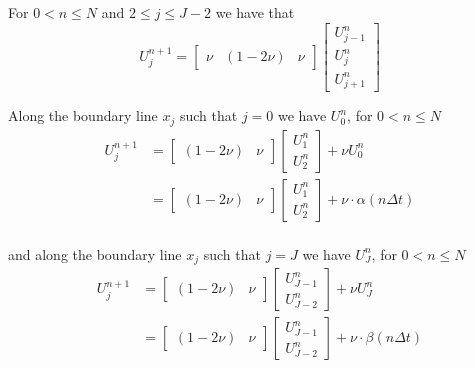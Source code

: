 \documentclass[12pt]{article}
\begin{document}
For $0 < n \leq N$ and $2 \leq j \leq J - 2$ we have that
\begin{equation*}
	U^{n + 1}_j =
	\begin{bmatrix}
		\nu & (1 - 2\nu) & \nu
	\end{bmatrix}
	\begin{bmatrix}
		U^n_{j - 1} \\
		U^n_j \\
		U^n_{j + 1}
	\end{bmatrix}
\end{equation*}

Along the boundary line $x_j$ such that $j = 0$ we have $U^n_0$, for $0 < n \leq N$
\begin{align*}
	U^{n + 1}_j &= 
	\begin{bmatrix}
		(1 - 2\nu) & \nu
	\end{bmatrix}
	\begin{bmatrix}
		U^n_1 \\
		U^n_2
	\end{bmatrix} + \nu U^n_0 \\
	&=
		\begin{bmatrix}
		(1 - 2\nu) & \nu
	\end{bmatrix}
	\begin{bmatrix}
		U^n_1 \\
		U^n_2
	\end{bmatrix} + \nu \cdot \alpha(n \Delta t) \\
\end{align*}

and along the boundary line $x_j$ such that $j = J$ we have $U^n_J$, for $0 < n \leq N$
\begin{align*}
	U^{n + 1}_j &=
	\begin{bmatrix}
		(1 - 2\nu) & \nu
	\end{bmatrix}
	\begin{bmatrix}
		U^n_{J - 1} \\
		U^n_{J - 2}
	\end{bmatrix} + \nu U^n_J	\\
	&=
		\begin{bmatrix}
		(1 - 2\nu) & \nu
	\end{bmatrix}
	\begin{bmatrix}
		U^n_{J - 1} \\
		U^n_{J - 2}
	\end{bmatrix} + \nu \cdot \beta(n \Delta t) \\
\end{align*}
\end{document}
